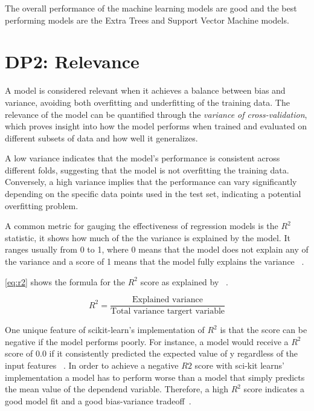 The overall performance of the machine learning models are good and the best performing models are the Extra Trees and
Support Vector Machine models.


\section{DP2: Relevance}\label{sec:relevance}

A model is considered relevant when it achieves a balance between bias and
variance, avoiding both overfitting and underfitting of the training data.
The relevance of the model can be quantified through the \textit{variance of cross-validation}, which proves insight
into how the model performs when trained and
evaluated on different subsets of data and how well it generalizes.

A low variance indicates that the model's performance is consistent across
different folds, suggesting that the model is not overfitting the training data.
Conversely, a high variance implies that the performance can vary significantly
depending on the specific data points used in the test set, indicating a potential
overfitting problem.

A common metric for gauging the effectiveness of regression models is the $R^2$ statistic, it shows how much of the
the variance is explained by the model.
It ranges usually from 0 to 1, where 0 means that the model does not explain any of the variance and a score of 1
means that the model fully explains the variance
~\cite[p. 43]{muller_introductionmachinelearning_2016}.

\cref{eq:r2} shows the formula for the $R^2$ score as explained by
~\cite[p. 43]{muller_introductionmachinelearning_2016}.

\begin{tcolorbox}[arc=0pt,boxrule=0.5pt]
    \begin{equation}
        \label{eq:r2}
        R^2 = \frac{\text{Explained variance}}{\text{Total variance targert variable}}
    \end{equation}
\end{tcolorbox}

One unique feature of scikit-learn's implementation of $R^2$ is that the score can be negative if the model performs
poorly.
For instance, a model would receive a $R^2$ score of 0.0 if it consistently predicted the expected value of y
regardless of the input features
~\cite{_sklearnmetricsr2_}.
In order to achieve a negative $R2$ score with sci-kit learns' implementation a model has to perform worse than a
model that simply predicts the mean value of the dependend variable.
Therefore, a high $R^2$ score indicates a good model fit and a good bias-variance
tradeoff~\cite[p. 43]{muller_introductionmachinelearning_2016}.

